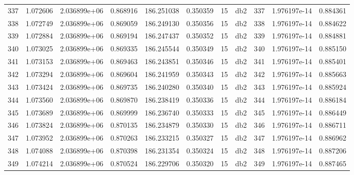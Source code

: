 \begin{tabular}{lrrrrrrlrrr}
337  &    1.072606 &        2.036899e+06 &  0.868916 &              186.251038 &    0.350359 &      15 &          db2 &    337 &   1.976197e-14 &      0.884361 \\
338  &    1.072749 &        2.036899e+06 &  0.869059 &              186.249130 &    0.350356 &      15 &          db2 &    338 &   1.976197e-14 &      0.884622 \\
339  &    1.072884 &        2.036899e+06 &  0.869194 &              186.247437 &    0.350352 &      15 &          db2 &    339 &   1.976197e-14 &      0.884881 \\
340  &    1.073025 &        2.036899e+06 &  0.869335 &              186.245544 &    0.350349 &      15 &          db2 &    340 &   1.976197e-14 &      0.885150 \\
341  &    1.073153 &        2.036899e+06 &  0.869463 &              186.243851 &    0.350346 &      15 &          db2 &    341 &   1.976197e-14 &      0.885401 \\
342  &    1.073294 &        2.036899e+06 &  0.869604 &              186.241959 &    0.350343 &      15 &          db2 &    342 &   1.976197e-14 &      0.885663 \\
343  &    1.073424 &        2.036899e+06 &  0.869735 &              186.240280 &    0.350340 &      15 &          db2 &    343 &   1.976197e-14 &      0.885924 \\
344  &    1.073560 &        2.036899e+06 &  0.869870 &              186.238419 &    0.350336 &      15 &          db2 &    344 &   1.976197e-14 &      0.886184 \\
345  &    1.073689 &        2.036899e+06 &  0.869999 &              186.236740 &    0.350333 &      15 &          db2 &    345 &   1.976197e-14 &      0.886449 \\
346  &    1.073824 &        2.036899e+06 &  0.870135 &              186.234879 &    0.350330 &      15 &          db2 &    346 &   1.976197e-14 &      0.886711 \\
347  &    1.073952 &        2.036899e+06 &  0.870263 &              186.233215 &    0.350327 &      15 &          db2 &    347 &   1.976197e-14 &      0.886962 \\
348  &    1.074088 &        2.036899e+06 &  0.870398 &              186.231354 &    0.350324 &      15 &          db2 &    348 &   1.976197e-14 &      0.887206 \\
349  &    1.074214 &        2.036899e+06 &  0.870524 &              186.229706 &    0.350320 &      15 &          db2 &    349 &   1.976197e-14 &      0.887465 \\

\end{tabular}
